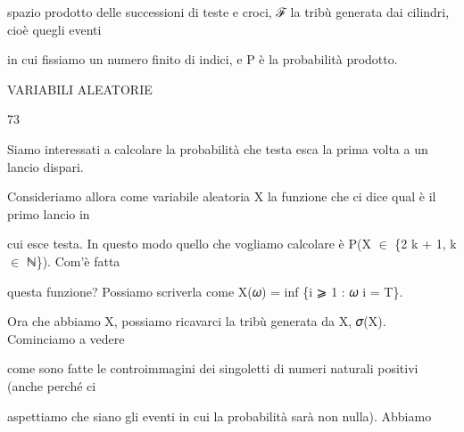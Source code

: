 \documentclass[a4paper,portrait,12pt]{article}
\begin{document}
\begin{flushleft}
spazio prodotto delle successioni di teste e croci, ℱ la tribù generata dai cilindri, cio\`{e} quegli eventi
\end{flushleft}


\begin{flushleft}
in cui fissiamo un numero finito di indici, e P \`{e} la probabilit\`{a} prodotto.
\end{flushleft}





\begin{flushleft}
\newpage
VARIABILI ALEATORIE
\end{flushleft}





73





\begin{flushleft}
Siamo interessati a calcolare la probabilit\`{a} che testa esca la prima volta a un lancio dispari.
\end{flushleft}


\begin{flushleft}
Consideriamo allora come variabile aleatoria X la funzione che ci dice qual \`{e} il primo lancio in
\end{flushleft}


\begin{flushleft}
cui esce testa. In questo modo quello che vogliamo calcolare \`{e} P(X $\in$ \{2 k + 1, k $\in$ ℕ\}). Com'\`{e} fatta
\end{flushleft}


\begin{flushleft}
questa funzione? Possiamo scriverla come X(𝜔) = inf \{i ⩾ 1 : 𝜔 i = T\}.
\end{flushleft}


\begin{flushleft}
Ora che abbiamo X, possiamo ricavarci la tribù generata da X, 𝜎(X). Cominciamo a vedere
\end{flushleft}


\begin{flushleft}
come sono fatte le controimmagini dei singoletti di numeri naturali positivi (anche perch\'{e} ci
\end{flushleft}


\begin{flushleft}
aspettiamo che siano gli eventi in cui la probabilit\`{a} sar\`{a} non nulla). Abbiamo
\end{flushleft}
\end{document}
